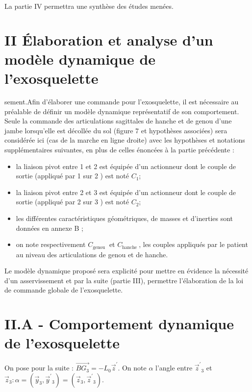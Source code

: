 \documentclass[10pt]{article}
\begin{document}
La partie IV permettra une synthèse des études menées.

\section{II Élaboration et analyse d'un modèle dynamique de l'exosquelette}
 sement.Afin d'élaborer une commande pour l'exosquelette, il est nécessaire au préalable de définir un modèle dynamique représentatif de son comportement. Seule la commande des articulations sagittales de hanche et de genou d'une jambe lorsqu'elle est décollée du sol (figure 7 et hypothèses associées) sera considérée ici (cas de la marche en ligne droite) avec les hypothèses et notations supplémentaires suivantes, en plus de celles énoncées à la partie précédente :

\begin{itemize}
  \item la liaison pivot entre 1 et 2 est équipée d'un actionneur dont le couple de sortie (appliqué par 1 sur 2 ) est noté $C_{1}$;

  \item la liaison pivot entre 2 et 3 est équipée d'un actionneur dont le couple de sortie (appliqué par 2 sur 3 ) est noté $C_{2}$;

  \item les différentes caractéristiques géométriques, de masses et d'inerties sont données en annexe B ;

  \item on note respectivement $C_{\text {genou }}$ et $C_{\text {hanche }}$, les couples appliqués par le patient au niveau des articulations de genou et de hanche.

\end{itemize}

Le modèle dynamique proposé sera explicité pour mettre en évidence la nécessité d'un asservissement et par la suite (partie III), permettre l'élaboration de la loi de commande globale de l'exosquelette.

\section{II.A - Comportement dynamique de l'exosquelette}
On pose pour la suite : $\overrightarrow{B G_{3}}=-L_{0} \vec{z}^{\prime}$. On note $\alpha$ l'angle entre $\vec{z}^{\prime}{ }_{3}$ et $\vec{z}_{3}: \alpha=\left(\vec{y}_{3}, \vec{y}^{\prime}{ }_{3}\right)=\left(\vec{z}_{3}, \vec{z}^{\prime}{ }_{3}\right)$.
\end{document}
